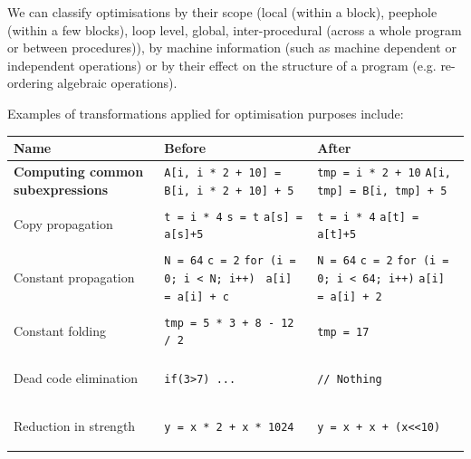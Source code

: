 We can classify optimisations by their scope (local (within a block),
peephole (within a few blocks), loop level, global, inter-procedural
(across a whole program or between procedures)), by machine
information (such as machine dependent or independent operations) or
by their effect on the structure of a program (e.g. re-ordering
algebraic operations).

Examples of transformations applied for optimisation purposes include:

\begin{tabular}{>{\bfseries}p{}p{}p{}}
Name & \textbf{Before} & \textbf{After}\\ \hline

  Computing common subexpressions &
  \texttt{A[i, i * 2 + 10] = B[i, i * 2 + 10] + 5} &
  \texttt{tmp = i * 2 + 10}\newline
  \texttt{A[i, tmp] = B[i, tmp] + 5}\\ \hline
  
  Copy propagation &
  \texttt{t = i * 4}\newline
  \texttt{s = t}\newline
  \texttt{a[s] = a[s]+5} &
  \texttt{t = i * 4}\newline
  \texttt{a[t] = a[t]+5}\\ \hline

  Constant propagation &
  \texttt{N = 64}\newline
  \texttt{c = 2}\newline
  \texttt{for (i = 0; i < N; i++) }\newline
  \texttt{a[i] = a[i] + c}\newline
  \texttt{}&
  \texttt{N = 64}\newline
  \texttt{c = 2}\newline
  \texttt{for (i = 0; i < 64; i++)}\newline
  \texttt{a[i] = a[i] + 2}\newline
  \texttt{}\\ \hline

  Constant folding &
  \texttt{tmp = 5 * 3 + 8 - 12 / 2} &
  \texttt{tmp = 17}\\ \hline

  Dead code elimination &
  \texttt{if(3>7) {...}} &
  \texttt{// Nothing}\\ \hline

  Reduction in strength &
  \texttt{y = x * 2 + x * 1024} &
  \texttt{y = x + x + (x<<10)}\\ \hline

\end{tabular}

